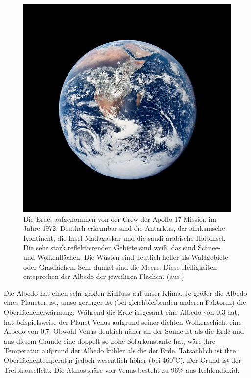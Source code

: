 \begin{figure}
\includegraphics[trim=70 70 70 70, clip, scale = 0.3]{./Bilder_Klima/as17-Albedo_small.jpg}
\caption{\label{fig_NASA_Welt}%
Die Erde, aufgenommen von der Crew der Apollo-17 Mission im Jahre 1972. Deutlich erkennbar sind
die Antarktis, der afrikanische Kontinent, die Insel Madagaskar und die saudi-arabische Halbinsel. Die sehr
stark reflektierenden Gebiete sind wei\ss, das sind Schnee- und Wolkenfl\"achen. Die W\"usten sind
deutlich heller als Waldgebiete oder Grasfl\"achen. 
Sehr dunkel sind die Meere. Diese Helligkeiten entsprechen der
Albedo der jeweiligen Fl\"achen. (aus \cite{NASA_World})}
\end{figure}

Die Albedo hat einen sehr gro\ss en Einfluss auf unser Klima. Je gr\"o\ss er die Albedo eines
Planeten ist, umso geringer ist (bei gleichbleibenden anderen Faktoren) die Oberfl\"achenerw\"armung. 
W\"ahrend die Erde insgesamt eine Albedo von 0,3 hat, hat beispielsweise der Planet Venus 
aufgrund seiner dichten Wolkenschicht eine Albedo von 0,7. Obwohl Venus deutlich n\"aher an der Sonne
ist als die Erde und aus diesem Grunde eine doppelt so hohe Solarkonstante hat, w\"are ihre
Temperatur aufgrund der Albedo k\"uhler als die der Erde. Tats\"achlich ist ihre Oberfl\"achentemperatur 
jedoch wesentlich h\"oher (bei $460^\circ$C). Der Grund ist der Treibhauseffekt: Die Atmosph\"are
von Venus besteht zu 96\% aus Kohlendioxid. 

